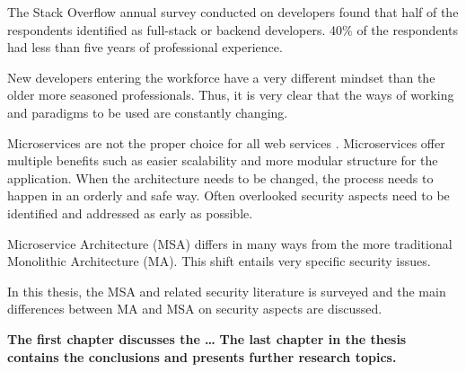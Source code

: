 \begin{sloppypar}
    The Stack Overflow annual survey \citep{sosurvey2019} conducted on 
    developers found that half of the respondents identified as full-stack or 
    backend developers. 40\% of the respondents had less than five years of 
    professional experience.
\end{sloppypar}
\begin{sloppypar}
    New developers entering the workforce have a very different mindset than 
    the older more seasoned professionals. Thus, it is very clear that the ways 
    of working and paradigms to be used are constantly changing.
\end{sloppypar}
\begin{sloppypar}
     Microservices are not the proper choice for all web services 
     \citep{newman2019}. Microservices offer multiple benefits such as easier 
     scalability and more modular structure for the application. When the 
     architecture needs to be changed, the process needs to happen in an orderly 
     and safe way. Often overlooked security aspects need to be identified and 
     addressed as early as possible.
\end{sloppypar}
\begin{sloppypar}
    Microservice Architecture (MSA) differs in many ways from 
    the more traditional Monolithic Architecture (MA). This shift entails very 
    specific security issues.
\end{sloppypar}
\begin{sloppypar}
    In this thesis, the MSA and related security literature is surveyed and the 
    main differences between MA and MSA on security aspects are discussed. 
\end{sloppypar}
\begin{sloppypar}
    \textbf{The first chapter discusses the \dots}
    \textbf{The last chapter in the thesis contains the conclusions and presents further research topics.}
\end{sloppypar}




